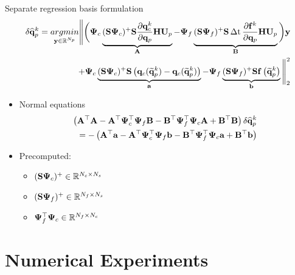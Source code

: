 \documentclass[]{beamer}
\begin{document}
\begin{frame}{Separate regression basis formulation}
	\vspace{-1.9em}
	\begin{align*}
		\delta \primVecCoef^{\newtonIdx} = \underset{\dummyVec \in \mathbb{R}^{\numPrimModes}}{argmin} \Bigg\lVert \bigg(\deimBasisCons \underbrace{\deimRegressorConsTiny \sampMat \pde{\consVec^{\newtonIdx}}{\primVec} \primScale \primTrial }_{\dummyMatOne} - \deimBasisRhs \underbrace{\deimRegressorRhsTiny \sampMat \, \dt \, \pde{\rhsVec^{\newtonIdx}}{\primVec} \primScale \primTrial}_{\dummyMatTwo} \bigg) \dummyVec \\
		+ \deimBasisCons \underbrace{\deimRegressorConsTiny \sampMat \left( \consVec(\primVecRom^{\newtonIdx}) - \consVec(\primVecRom^{\newtonIdx}) \right)}_{\dummyVecOne} - \deimBasisRhs \underbrace{\deimRegressorRhsTiny \sampMat \rhsFunc{\primVecRom^{\newtonIdx}}}_{\dummyVecTwo} \Bigg\rVert_2^2
	\end{align*}
	\vspace{-1em}
	\begin{itemize}
		\item Normal equations
		\begin{align*}
			\left(\dummyMatOne^\top \dummyMatOne - \dummyMatOne^\top \deimBasisCons^\top \deimBasisRhs \dummyMatTwo - \dummyMatTwo^\top \deimBasisRhs^\top \deimBasisCons \dummyMatOne + \dummyMatTwo^\top \dummyMatTwo \right) \delta \primVecCoef^{\newtonIdx} \\
			= -\left(\dummyMatOne^\top \dummyVecOne - \dummyMatOne^\top \deimBasisCons^\top \deimBasisRhs \dummyVecTwo - \dummyMatTwo^\top \deimBasisRhs^\top \deimBasisCons \dummyVecOne + \dummyMatTwo^\top \dummyVecTwo\right)
		\end{align*}
		\item Precomputed:
		\begin{itemize}
			\item $\deimRegressorConsTiny \in \mathbb{R}^{\numConsvModes \times \numSamps}$
			\item $\deimRegressorRhsTiny \in \mathbb{R}^{\numRHSModes \times \numSamps}$
			\item $\deimBasisRhs^\top \deimBasisCons \in \mathbb{R}^{\numRHSModes \times \numConsvModes}$
		\end{itemize}
	\end{itemize}
\end{frame}

\section*{Numerical Experiments}
\end{document}
